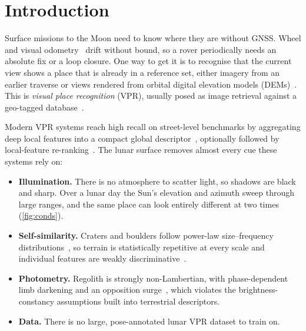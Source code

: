 \section{Introduction}\label{sec:intro}
Surface missions to the Moon need to know where they are without GNSS. Wheel and visual
odometry~\cite{maimone2007mer} drift without bound, so a rover periodically needs an absolute fix
or a loop closure. One way to get it is to recognise that the current view shows a place that is
already in a reference set, either imagery from an earlier traverse or views rendered from orbital
digital elevation models (DEMs)~\cite{johnson2008trn,ceresoli2025optical}. This is
\emph{visual place recognition} (VPR), usually posed as image retrieval against a geo-tagged
database~\cite{lowry2015visual,schubert2023tutorial}.

Modern VPR systems reach high recall on street-level benchmarks by aggregating deep local
features into a compact global descriptor~\cite{arandjelovic2016netvlad,radenovic2019gem,berton2022cosplace,berton2023eigenplaces,izquierdo2024optimal},
optionally followed by local-feature re-ranking~\cite{hausler2021patch}. The lunar surface
removes almost every cue these systems rely on:
\begin{itemize}
\item \textbf{Illumination.} There is no atmosphere to scatter light, so shadows are black and
sharp. Over a lunar day the Sun's elevation and azimuth sweep through large ranges, and the
same place can look entirely different at two times (\cref{fig:conds}).
\item \textbf{Self-similarity.} Craters and boulders follow power-law size--frequency
distributions~\cite{neukum2001cratering,melosh1989impact}, so terrain is statistically repetitive
at every scale and individual features are weakly discriminative~\cite{torii2013visual}.
\item \textbf{Photometry.} Regolith is strongly non-Lambertian, with phase-dependent limb
darkening and an opposition surge~\cite{mcewen1991photometric,hapke2012theory}, which violates the
brightness-constancy assumptions built into terrestrial descriptors.
\item \textbf{Data.} There is no large, pose-annotated lunar VPR dataset to train on.
\end{itemize}


